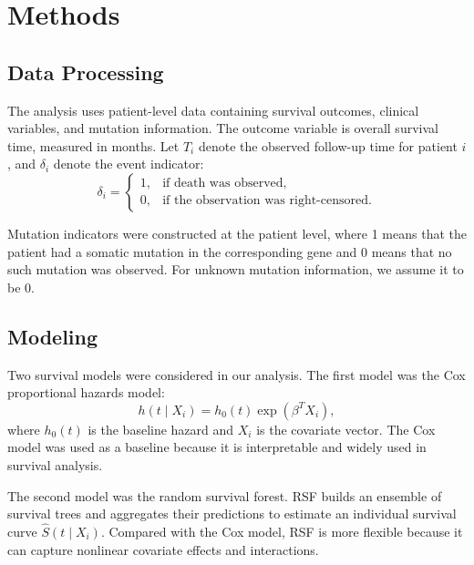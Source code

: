 \documentclass[11pt]{article}
\begin{document}

\section{Methods}

\subsection{Data Processing}

The analysis uses patient-level data containing survival outcomes, clinical variables, and mutation information. The outcome variable is overall survival time, measured in months. Let $T_i$ denote the observed follow-up time for patient $i$, and $\delta_i$ denote the event indicator:
\[
\delta_i =
\begin{cases}
1, & \text{if death was observed},\\
0, & \text{if the observation was right-censored}.
\end{cases}
\]

Mutation indicators were constructed at the patient level, where 1 means that the patient had a somatic mutation in the corresponding gene and 0 means that no such mutation was observed. For unknown mutation information, we assume it to be 0.

\subsection{Modeling}

Two survival models were considered in our analysis. The first model was the Cox proportional hazards model:
\[
h(t \mid X_i) = h_0(t)\exp(\beta^T X_i),
\]
where $h_0(t)$ is the baseline hazard and $X_i$ is the covariate vector. The Cox model was used as a baseline because it is interpretable and widely used in survival analysis.

The second model was the random survival forest. RSF builds an ensemble of survival trees and aggregates their predictions to estimate an individual survival curve $\hat{S}(t \mid X_i)$. Compared with the Cox model, RSF is more flexible because it can capture nonlinear covariate effects and interactions. 
\end{document}
